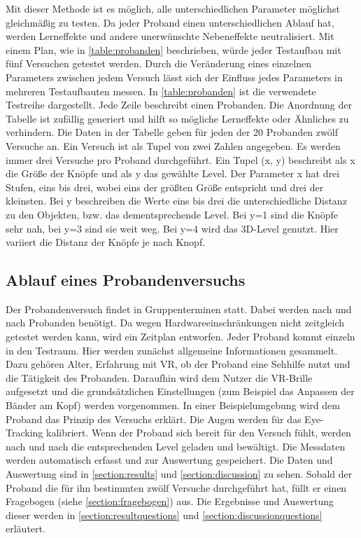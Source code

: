 Mit dieser Methode ist es möglich, alle unterschiedlichen Parameter möglichst gleichmäßig zu testen. Da jeder Proband einen unterschiedlichen Ablauf hat, werden Lerneffekte und andere unerwünschte Nebeneffekte neutralisiert. Mit einem Plan, wie in \autoref{table:probanden} beschrieben, würde jeder Testaufbau mit fünf Versuchen getestet werden. Durch die Veränderung eines einzelnen Parameters zwischen jedem Versuch lässt sich der Einfluss jedes Parameters in mehreren Testaufbauten messen. In \autoref{table:probanden} ist die verwendete Testreihe dargestellt. Jede Zeile beschreibt einen Probanden. Die Anordnung der Tabelle ist zufällig generiert und hilft so mögliche Lerneffekte oder Ähnliches zu verhindern. Die Daten in der Tabelle geben für jeden der 20 Probanden zwölf Versuche an. Ein Versuch ist als Tupel von zwei Zahlen angegeben. Es werden immer drei Versuche pro Proband durchgeführt. Ein Tupel (x, y) beschreibt als x die Größe der Knöpfe und als y das gewählte Level. Der Parameter x hat drei Stufen, eins bis drei, wobei eins der größten Größe entspricht und drei der kleinsten. Bei y beschreiben die Werte eins bis drei die unterschiedliche Distanz zu den Objekten, bzw. das dementsprechende Level. Bei y=1 sind die Knöpfe sehr nah, bei y=3 sind sie weit weg. Bei y=4 wird das 3D-Level genutzt. Hier variiert die Distanz der Knöpfe je nach Knopf. 

\subsection{Ablauf eines Probandenversuchs}
Der Probandenversuch findet in Gruppenterminen statt. Dabei werden nach und nach Probanden benötigt. Da wegen Hardwareeinschränkungen nicht zeitgleich getestet werden kann, wird ein Zeitplan entworfen. Jeder Proband kommt einzeln in den Testraum. Hier werden zunächst allgemeine Informationen gesammelt. Dazu gehören Alter, Erfahrung mit \ac{VR}, ob der Proband eine Sehhilfe nutzt und die Tätigkeit des Probanden. Daraufhin wird dem Nutzer die VR-Brille aufgesetzt und die grundsätzlichen Einstellungen (zum Beispiel das Anpassen der Bänder am Kopf) werden vorgenommen. In einer Beispielumgebung wird dem Proband das Prinzip des Versuchs erklärt. Die Augen werden für das Eye-Tracking kalibriert. Wenn der Proband sich bereit für den Versuch fühlt, werden nach und nach die entsprechenden Level geladen und bewältigt. Die Messdaten werden automatisch erfasst und zur Auswertung gespeichert. Die Daten und Auswertung sind in \autoref{section:results} und \autoref{section:discussion} zu sehen. Sobald der Proband die für ihn bestimmten zwölf Versuche durchgeführt hat, füllt er einen Fragebogen (siehe \autoref{section:fragebogen}) aus. Die Ergebnisse und Auswertung dieser werden in \autoref{section:resultquestions} und \autoref{section:discussionquestions} erläutert.

